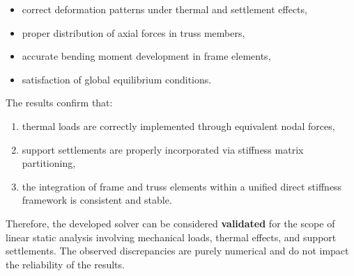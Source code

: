 \begin{itemize}
    \item correct deformation patterns under thermal and settlement effects,
    \item proper distribution of axial forces in truss members,
    \item accurate bending moment development in frame elements,
    \item satisfaction of global equilibrium conditions.
\end{itemize}

The results confirm that:
\begin{enumerate}
    \item thermal loads are correctly implemented through equivalent nodal forces,
    \item support settlements are properly incorporated via stiffness matrix partitioning,
    \item the integration of frame and truss elements within a unified direct stiffness framework is consistent and stable.
\end{enumerate}

Therefore, the developed solver can be considered \textbf{validated} for the scope of linear static analysis involving mechanical loads, thermal effects, and support settlements. The observed discrepancies are purely numerical and do not impact the reliability of the results.
